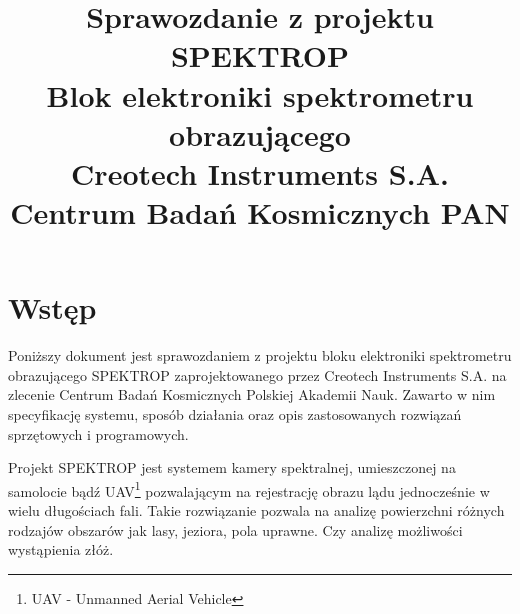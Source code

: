 \documentclass[a4paper,11pt,oneside]{report}  %
\title{Sprawozdanie z projektu SPEKTROP\\ Blok elektroniki spektrometru obrazującego \\[10pt] \large{Creotech Instruments S.A.} \\ \large{Centrum Badań Kosmicznych PAN}}
\begin{document}
%





\maketitle



\lstset{escapechar=@,style=custom}

\tableofcontents
\newpage

\listoffigures
\newpage	
\chapter{Wstęp} 
Poniższy dokument jest sprawozdaniem z projektu bloku elektroniki spektrometru obrazującego SPEKTROP zaprojektowanego przez Creotech Instruments S.A. na zlecenie Centrum Badań Kosmicznych Polskiej Akademii Nauk. Zawarto w nim specyfikację systemu, sposób działania oraz opis zastosowanych rozwiązań sprzętowych i programowych. 

Projekt SPEKTROP jest systemem kamery spektralnej, umieszczonej na samolocie bądź UAV\footnote{UAV - Unmanned Aerial Vehicle} pozwalającym na rejestrację obrazu lądu jednocześnie w wielu długościach fali.
Takie rozwiązanie pozwala na analizę powierzchni różnych rodzajów obszarów jak lasy, jeziora, pola uprawne. Czy analizę możliwości wystąpienia złóż.
\end{document}
